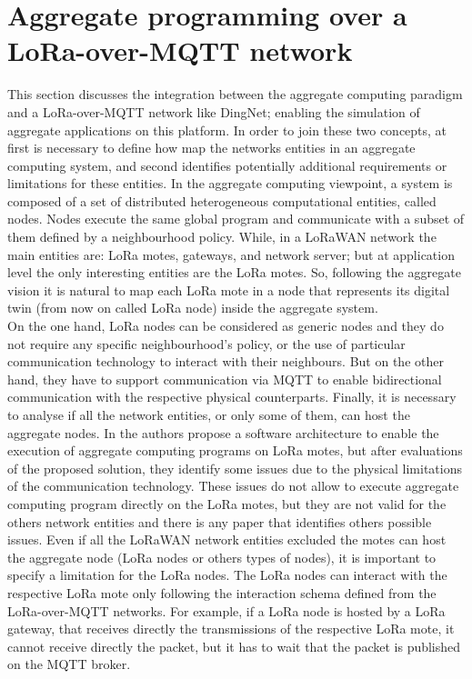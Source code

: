 \section{Aggregate programming over a LoRa-over-MQTT network}
\label{sec:contributionACOverDingNet}
This section discusses the integration between the aggregate computing paradigm and a LoRa-over-MQTT network like DingNet; enabling the simulation of aggregate applications on this platform.
In order to join these two concepts, at first is necessary to define how map the networks entities in an aggregate computing system, and second identifies potentially additional requirements or limitations for these entities.
In the aggregate computing viewpoint, a system is composed of a set of distributed heterogeneous computational entities, called nodes. Nodes execute the same global program and communicate with a subset of them defined by a neighbourhood policy. 
While, in a LoRaWAN network the main entities are: LoRa motes, gateways, and network server; but at application level the only interesting entities are the LoRa motes.
So, following the aggregate vision it is natural to map each LoRa mote in a node that represents its digital twin (from now on called LoRa node) inside the aggregate system.
\\On the one hand, LoRa nodes can be considered as generic nodes and they do not require any specific neighbourhood's policy, or the use of particular communication technology to interact with their neighbours. 
But on the other hand, they have to support communication via MQTT to enable bidirectional communication with the respective physical counterparts.
Finally, it is necessary to analyse if all the network entities, or only some of them, can host the aggregate nodes.
In \cite{CCNCPS2018} the authors propose a software architecture to enable the execution of aggregate computing programs on LoRa motes, but after evaluations of the proposed solution, they identify some issues due to the physical limitations of the communication technology. 
These issues do not allow to execute aggregate computing program directly on the LoRa motes, but they are not valid for the others network entities and there is any paper that identifies others possible issues.
Even if all the LoRaWAN network entities excluded the motes can host the aggregate node (LoRa nodes or others types of nodes), it is important to specify a limitation for the LoRa nodes. 
The LoRa nodes can interact with the respective LoRa mote only following the interaction schema defined from the LoRa-over-MQTT networks. 
For example, if a LoRa node is hosted by a LoRa gateway, that receives directly the transmissions of the respective LoRa mote, it cannot receive directly the packet, but it has to wait that the packet is published on the MQTT broker.

